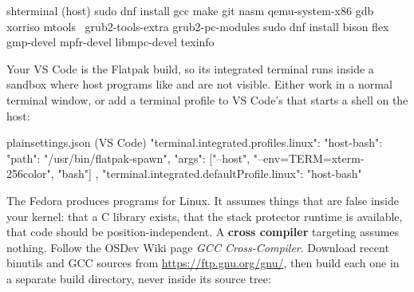 \documentclass[11pt,a4paper]{article}
\begin{document}
\begin{lst}{sh}{terminal (host)}
sudo dnf install gcc make git nasm qemu-system-x86 gdb xorriso mtools \
                 grub2-tools-extra grub2-pc-modules
sudo dnf install bison flex gmp-devel mpfr-devel libmpc-devel texinfo
\end{lst}

Your VS Code is the Flatpak build, so its integrated terminal runs inside a sandbox where host programs like
\code{nasm} and \code{qemu-system-i386} are not visible. Either work in a normal terminal window, or add a terminal
profile to VS Code's \code{settings.json} that starts a shell on the host:

\begin{lst}{plain}{settings.json (VS Code)}
"terminal.integrated.profiles.linux": {
  "host-bash": { "path": "/usr/bin/flatpak-spawn", "args": ["--host", "--env=TERM=xterm-256color", "bash"] }
},
"terminal.integrated.defaultProfile.linux": "host-bash"
\end{lst}

The Fedora  produces programs for Linux. It assumes things that are false inside your kernel: that a C
library exists, that the stack protector runtime is available, that code should be position-independent. A
\textbf{cross compiler} targeting \code{i686-elf} assumes nothing. Follow the OSDev Wiki page \emph{GCC
Cross-Compiler}. Download recent binutils and GCC sources from \url{https://ftp.gnu.org/gnu/}, then build each one in
a separate build directory, never inside its source tree:

\end{document}
